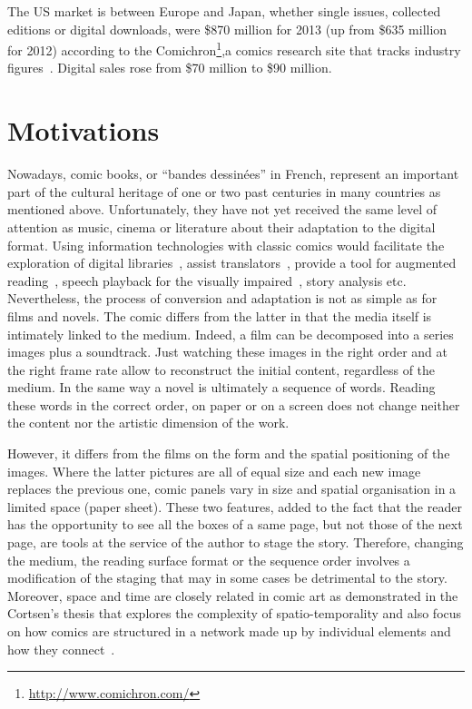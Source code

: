 The US market is between Europe and Japan, whether single issues, collected editions or digital downloads, were \$870 million for 2013 (up from \$635 million for 2012) according to the Comichron\footnote{\url{http://www.comichron.com/}},a comics research site that tracks industry figures~\cite{Miller2014}.
Digital sales rose from \$70 million to \$90 million.

\section{Motivations} %
\label{ssub:motivations}

Nowadays, comic books, or ``bandes dessin{\'e}es'' in French, represent an important part of the cultural heritage of one or two past centuries in many countries as mentioned above.
Unfortunately, they have not yet received the same level of attention as music, cinema or literature about their adaptation to the digital format.
Using information technologies with classic comics would facilitate the exploration of digital libraries~\cite{Back2001}, assist translators~\cite{borodo2014multimodality}, provide a tool for augmented reading~\cite{Singh2004,Raulet2013Comics}, speech playback for the visually impaired~\cite{Brandon2014,Ponsard09}, story analysis etc.
Nevertheless, the process of conversion and adaptation is not as simple as for films and novels.
The comic differs from the latter in that the media itself is intimately linked to the medium.
Indeed, a film can be decomposed into a series images plus a soundtrack.
Just watching these images in the right order and at the right frame rate allow to reconstruct the initial content, regardless of the medium. 
In the same way a novel is ultimately a sequence of words.
Reading these words in the correct order, on paper or on a screen does not change neither the content nor the artistic dimension of the work.

However, it differs from the films on the form and the spatial positioning of the images.
Where the latter pictures are all of equal size and each new image replaces the previous one, comic panels vary in size and spatial organisation in a limited space (paper sheet).
These two features, added to the fact that the reader has the opportunity to see all the boxes of a same page, but not those of the next page, are tools at the service of the author to stage the story.
Therefore, changing the medium, the reading surface format or the sequence order involves a modification of the staging that may in some cases be detrimental to the story.
Moreover, space and time are closely related in comic art as demonstrated in the Cortsen's thesis that explores the complexity of spatio-temporality and also focus on how comics are structured in a network made up by individual elements and how they connect~\cite{Cortsen2012Comics}.

